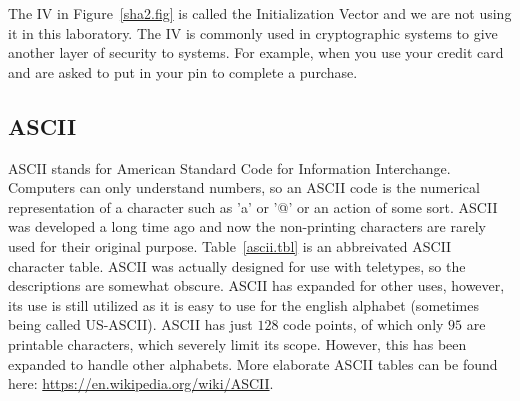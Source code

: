 \documentclass{article}
\begin{document}
The IV in Figure~\ref{sha2.fig} is called the Initialization Vector
and we are not using it in this laboratory.  The IV is commonly
used in cryptographic systems to give another layer of security to
systems.  For example, when
you use your credit card and are asked to put in your pin to complete a purchase.

\subsection{ASCII}

ASCII stands for American Standard Code for Information
Interchange. Computers can only understand numbers, so an ASCII code
is the numerical representation of a character such as 'a' or '@' or
an action of some sort. ASCII was developed a long time ago and now
the non-printing characters are rarely used for their original
purpose. Table~\ref{ascii.tbl} is an abbreivated
ASCII character table. ASCII was
actually designed for use with teletypes, so the descriptions are
somewhat obscure.
ASCII has expanded for other uses, however, its use is still
utilized as it is easy to use for the english alphabet (sometimes being
called US-ASCII).
ASCII has just $128$ code points, of which only $95$ are printable
characters, which severely limit its scope.  However, this has been
expanded to handle other alphabets.  More elaborate ASCII tables can
be found here: \url{https://en.wikipedia.org/wiki/ASCII}.
\end{document}
